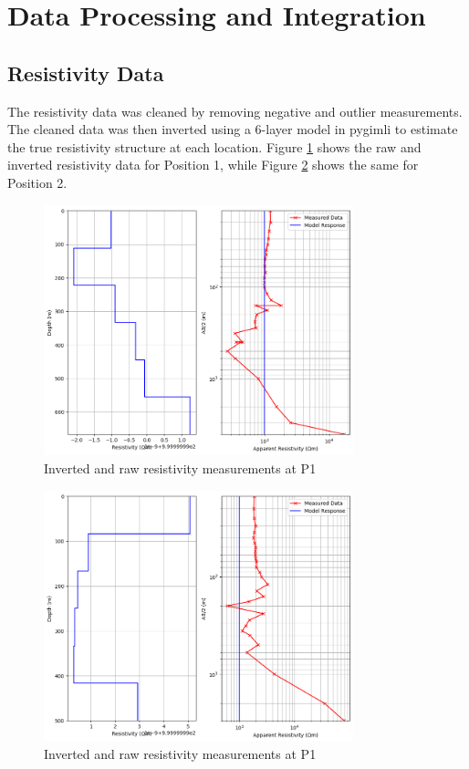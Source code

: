 \documentclass{article}
\begin{document}
\section{Data Processing and Integration}

\subsection{Resistivity Data}

The resistivity data was cleaned by removing negative and outlier measurements. The cleaned data was then inverted using a 6-layer model in pygimli to estimate the true resistivity structure at each location. Figure \ref{fig:res_p1} shows the raw and inverted resistivity data for Position 1, while Figure \ref{fig:res_p2} shows the same for Position 2.

\begin{figure}[H]
	\centering
	\includegraphics[width=0.8\textwidth]{resistivity_p1.png}
	\caption{Inverted and raw resistivity measurements at P1}
	\label{fig:res_p1}
\end{figure}

\begin{figure}[H]
	\centering
	\includegraphics[width=0.8\textwidth]{resistivity_p2.png}
	\caption{Inverted and raw resistivity measurements at P1}
	\label{fig:res_p2}
\end{figure}
\end{document}
